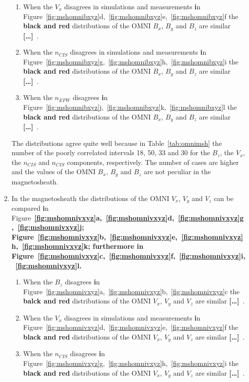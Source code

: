 \documentclass[linenumbers,draft]{agujournal}
\newcommand{\del}{\textbf{[\dots]}\ } %
\begin{document}
\begin{enumerate}
\begin{enumerate}
\item When the $V_{x}$ disagrees in simulations and measurements \textbf{i}n Figure~\ref{fig:mshomnibxyz}d,~\ref{fig:mshomnibxyz}e,~\ref{fig:mshomnibxyz}f the \textbf{black and red} distributions of the OMNI $B_{x}$, $B_{y}$ and $B_{z}$ are similar \del . 
  
\item When the $n_{CIS}$ disagrees in simulations and measurements \textbf{i}n Figure~\ref{fig:mshomnibxyz}g,~\ref{fig:mshomnibxyz}h,~\ref{fig:mshomnibxyz}i the \textbf{black and red} distributions of the OMNI $B_{x}$, $B_{y}$ and $B_{z}$ are similar \del.

\item When the $n_{EFW}$ disagrees \textbf{i}n Figure~\ref{fig:mshomnibxyz}j,~\ref{fig:mshomnibxyz}k,~\ref{fig:mshomnibxyz}l the \textbf{black and red} distributions of the OMNI $B_{x}$, $B_{y}$ and $B_{z}$ are similar \del.
\end{enumerate}
The distributions agree quite well because in Table~\ref{tab:omnimsh} the number of the poorly correlated intervals 18, 50, 33 and 30 for the $B_{z}$, the $V_{x}$, the $n_{CIS}$ and $n_{CIS}$ components, respectively. The number of cases are higher and the values of the OMNI $B_{x}$, $B_{y}$ and $B_{z}$ are not peculiar in the magnetosheath.

\item In the magnetosheath the distributions of the OMNI $V_{x}$, $V_{y}$ and $V_{z}$ can be compared \textbf{i}n Figure~\textbf{\ref{fig:mshomnivxyz}a,~\ref{fig:mshomnivxyz}d,~\ref{fig:mshomnivxyz}g,~\ref{fig:mshomnivxyz}j; Figure~\ref{fig:mshomnivxyz}b,~\ref{fig:mshomnivxyz}e,~\ref{fig:mshomnivxyz}h,~\ref{fig:mshomnivxyz}k; furthermore \textbf{i}n Figure~\ref{fig:mshomnivxyz}c,~\ref{fig:mshomnivxyz}f,~\ref{fig:mshomnivxyz}i,~\ref{fig:mshomnivxyz}l.}
\begin{enumerate}
\item When the $B_{z}$ disagrees \textbf{i}n Figure~\ref{fig:mshomnivxyz}a,~\ref{fig:mshomnivxyz}b,~\ref{fig:mshomnivxyz}c the \textbf{balck and red }distributions of the OMNI $V_{x}$, $V_{y}$ and $V_{z}$ are similar \del .

\item When the $V_{x}$ disagrees in simulations and measurements \textbf{i}n Figure~\ref{fig:mshomnivxyz}d,~\ref{fig:mshomnivxyz}e,~\ref{fig:mshomnivxyz}f the \textbf{black and red} distributions of the OMNI $V_{x}$, $V_{y}$ and $V_{z}$ are similar \del .

\item When the $n_{CIS}$ disagrees \textbf{i}n Figure~\ref{fig:mshomnivxyz}g,~\ref{fig:mshomnivxyz}h,~\ref{fig:mshomnivxyz}i the \textbf{black and red} distributions of the OMNI $V_{x}$, $V_{y}$ and $V_{z}$ are similar \del.


\end{enumerate}
\end{enumerate}
\end{document}
